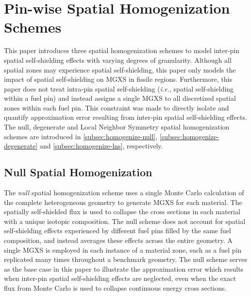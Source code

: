 \section{Pin-wise Spatial Homogenization Schemes}
\label{sec:pin-wise-shielding}

This paper introduces three spatial homogenization schemes to model inter-pin spatial self-shielding effects with varying degrees of granularity. Although all spatial zones may experience spatial self-shielding, this paper only models the impact of spatial self-shielding on MGXS in fissile regions. Furthermore, this paper does not treat intra-pin spatial self-shielding (\textit{i.e.}, spatial self-shielding within a fuel pin) and instead assigns a single MGXS to all discretized spatial zones within each fuel pin. This constraint was made to directly isolate and quantify approximation error resulting from inter-pin spatial self-shielding effects. The null, degenerate and Local Neighbor Symmetry spatial homogenization schemes are introduced in \autoref{subsec:homogenize-null}, \autoref{subsec:homogenize-degenerate} and \autoref{subsec:homogenize-lns}, respectively.


\subsection{Null Spatial Homogenization}
\label{subsec:homogenize-null}

The \textit{null} spatial homogenization scheme uses a single Monte Carlo calculation of the complete heterogeneous geometry to generate MGXS for each material. The spatially self-shielded flux is used to collapse the cross sections in each material with a unique isotopic composition. The null scheme does not account for spatial self-shielding effects experienced by different fuel pins filled by the same fuel composition, and instead averages these effects across the entire geometry. A single MGXS is employed in each instance of a material zone, such as a fuel pin replicated many times throughout a benchmark geometry. The null scheme serves as the base case in this paper to illustrate the approximation error which results when inter-pin spatial self-shielding effects are neglected, even when the exact flux from Monte Carlo is used to collapse continuous energy cross sections.


